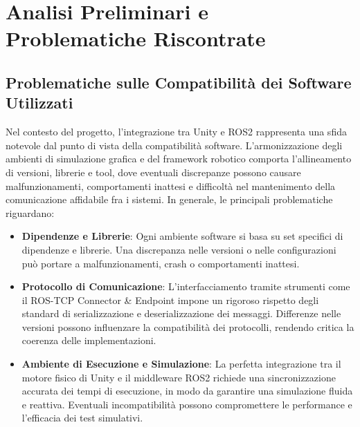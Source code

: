 \documentclass[11pt]{report}
\begin{document}
\chapter{Analisi Preliminari e Problematiche Riscontrate}
\label{sec:Problemi}
\section{Problematiche sulle Compatibilità dei Software Utilizzati}
\label{sec:Problemi_Compatibilità}
Nel contesto del progetto, l’integrazione tra Unity e ROS2 rappresenta una sfida notevole dal punto di vista della compatibilità software. L’armonizzazione degli ambienti di simulazione grafica e del framework robotico comporta l’allineamento di versioni, librerie e tool, dove eventuali discrepanze possono causare malfunzionamenti, comportamenti inattesi e difficoltà nel mantenimento della comunicazione affidabile fra i sistemi. In generale, le principali problematiche riguardano:
\begin{itemize}
    \item \textbf{Dipendenze e Librerie}: Ogni ambiente software si basa su set specifici di dipendenze e librerie. Una discrepanza nelle versioni o nelle configurazioni può portare a malfunzionamenti, crash o comportamenti inattesi.

    \item \textbf{Protocollo di Comunicazione}: L’interfacciamento tramite strumenti come il ROS-TCP Connector \& Endpoint impone un rigoroso rispetto degli standard di serializzazione e deserializzazione dei messaggi. Differenze nelle versioni possono influenzare la compatibilità dei protocolli, rendendo critica la coerenza delle implementazioni.
    
    \item \textbf{Ambiente di Esecuzione e Simulazione}: La perfetta integrazione tra il motore fisico di Unity e il middleware ROS2 richiede una sincronizzazione accurata dei tempi di esecuzione, in modo da garantire una simulazione fluida e reattiva. Eventuali incompatibilità possono compromettere le performance e l’efficacia dei test simulativi.
\end{itemize}
\end{document}
